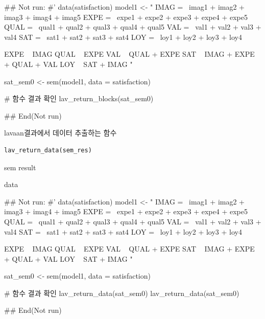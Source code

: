 \documentclass[a4paper]{book}
\begin{document}
%
\begin{Examples}
\begin{ExampleCode}

## Not run: 
#'
data(satisfaction)
model1 <- "
IMAG =~ imag1 + imag2 + imag3 + imag4 + imag5
EXPE =~ expe1 + expe2 + expe3 + expe4 + expe5
QUAL =~ qual1 + qual2 + qual3 + qual4 + qual5
VAL =~ val1 + val2 + val3 + val4
SAT =~ sat1 + sat2 + sat3 + sat4
LOY =~ loy1 + loy2 + loy3 + loy4

EXPE ~ IMAG
QUAL ~ EXPE
VAL ~  QUAL + EXPE
SAT ~ IMAG + EXPE + QUAL + VAL
LOY ~ SAT + IMAG
"

sat_sem0 <- sem(model1, data = satisfaction)

# 함수 결과 확인
lav_return_blocks(sat_sem0)

## End(Not run)

\end{ExampleCode}
\end{Examples}
%
\begin{Description}
lavaan결과에서 데이터 추출하는 함수
\end{Description}
%
\begin{Usage}
\begin{verbatim}
lav_return_data(sem_res)
\end{verbatim}
\end{Usage}
%
\begin{Arguments}
\begin{ldescription}
\item[\code{sem\_res}] sem result
\end{ldescription}
\end{Arguments}
%
\begin{Value}
data
\end{Value}
%
\begin{Examples}
\begin{ExampleCode}

## Not run: 
#'
data(satisfaction)
model1 <- "
IMAG =~ imag1 + imag2 + imag3 + imag4 + imag5
EXPE =~ expe1 + expe2 + expe3 + expe4 + expe5
QUAL =~ qual1 + qual2 + qual3 + qual4 + qual5
VAL =~ val1 + val2 + val3 + val4
SAT =~ sat1 + sat2 + sat3 + sat4
LOY =~ loy1 + loy2 + loy3 + loy4

EXPE ~ IMAG
QUAL ~ EXPE
VAL ~  QUAL + EXPE
SAT ~ IMAG + EXPE + QUAL + VAL
LOY ~ SAT + IMAG
"

sat_sem0 <- sem(model1, data = satisfaction)

# 함수 결과 확인
lav_return_data(sat_sem0)
lav_return_data(sat_sem0)%

## End(Not run)


\end{ExampleCode}
\end{Examples}
\end{document}
